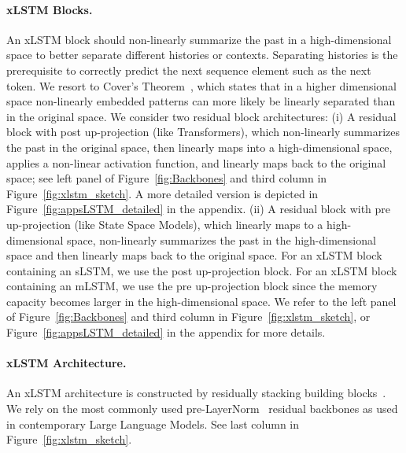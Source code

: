 \documentclass[dvipsnames]{article}
\begin{document}
\paragraph{xLSTM Blocks.}
\label{sec:xLSTMblock}
An xLSTM block should non-linearly summarize the past in a high-dimensional
space to better separate different histories or contexts. 
Separating histories is the prerequisite to correctly predict the
next sequence element such as the next token.
We resort to Cover’s Theorem~\citep{Cover:65}, which states that
in a higher dimensional space non-linearly embedded patterns
can more likely be linearly separated
than in the original space.  
We consider two residual block architectures:
(i) A residual block with post up-projection
(like Transformers), which
non-linearly summarizes the past in the original space,
then linearly maps into a high-dimensional space,
applies a non-linear activation function, and 
linearly maps back to the original space;
see left panel of Figure~\ref{fig:Backbones}
and third column in Figure~\ref{fig:xlstm_sketch}. 
A more detailed version is depicted in Figure~\ref{fig:appsLSTM_detailed}
in the appendix.
(ii) A residual block with pre up-projection 
(like State Space Models), which 
linearly maps to a high-dimensional space, 
non-linearly summarizes the past in the high-dimensional space
and
then linearly maps back to the original space.
For an xLSTM block containing an sLSTM,
we use the post up-projection block. 
For an xLSTM block containing an mLSTM,
we use the pre up-projection block since
the memory capacity becomes larger in the high-dimensional space.
We refer to the left panel of Figure~\ref{fig:Backbones}
and third column in Figure~\ref{fig:xlstm_sketch}, 
or Figure~\ref{fig:appsLSTM_detailed} in the appendix for more details.


\paragraph{xLSTM Architecture. }
\label{sec:xLSTMarchitecure}
An xLSTM architecture is constructed by residually stacking building blocks~\citep{Srivastava:15,He:16}. We rely on the most commonly used pre-LayerNorm~\citep{Ba:16b} residual backbones as used in contemporary Large Language Models.
See last column in Figure~\ref{fig:xlstm_sketch}. 

\end{document}
